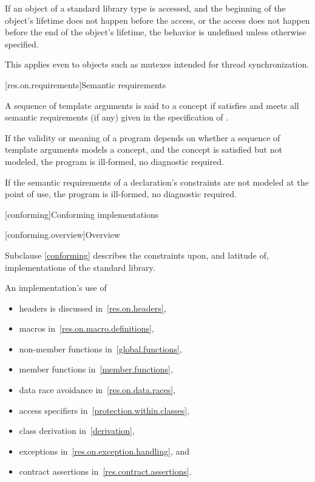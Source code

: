 \pnum
If an object of a standard library type is accessed, and
the beginning of the object's lifetime
does not happen before the access, or
the access does not happen before the end of the object's lifetime,
the behavior is undefined unless otherwise specified.
\begin{note}
This applies even to objects such as mutexes intended for thread synchronization.
\end{note}

[res.on.requirements]{Semantic requirements}

\pnum
A sequence  of template arguments is said to
%
 a concept 
if 
satisfies  and
meets all semantic requirements (if any)
given in the specification of .

\pnum
If the validity or meaning of a program
depends on whether a sequence of template arguments models a concept, and
the concept is satisfied but not modeled,
the program is ill-formed, no diagnostic required.

\pnum
If the semantic requirements of a declaration's
constraints are not modeled at the point of use,
the program is ill-formed, no diagnostic required.

[conforming]{Conforming implementations}

[conforming.overview]{Overview}

\pnum
Subclause \ref{conforming} describes the constraints upon, and latitude of, implementations of the \Cpp{} standard library.

\pnum
An implementation's use of
\begin{itemize}
\item headers is discussed in~\ref{res.on.headers},
\item macros in~\ref{res.on.macro.definitions},
\item non-member functions in~\ref{global.functions},
\item member functions in~\ref{member.functions},
\item data race avoidance in~\ref{res.on.data.races},
\item access specifiers in~\ref{protection.within.classes},
\item class derivation in~\ref{derivation},
\item exceptions in~\ref{res.on.exception.handling}, and
\item contract assertions in~\ref{res.contract.assertions}.
\end{itemize}

